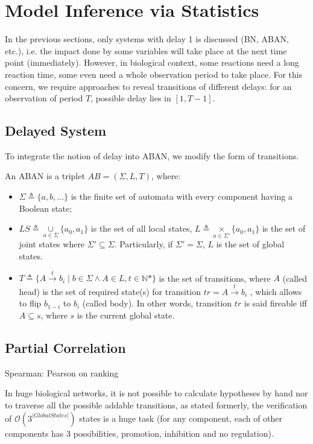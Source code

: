  

\section{Model Inference via Statistics}
In the previous sections, only systems with delay 1 is discussed (BN, ABAN, etc.), i.e. the impact done by some variables will take place at the next time point (immediately).
However, in biological context, some reactions need a long reaction time, some even need a whole observation period to take place.
For this concern, we require approaches to reveal transitions of different delays: for an observation of period $T$, possible delay lies in $[1,T-1]$.

\subsection{Delayed System}
To integrate the notion of delay into ABAN, we modify the form of transitions.

\begin{definition}
An ABAN is a triplet $AB = (\Sigma,L,T)$, where:
\begin{itemize}
\item $\Sigma\triangleq\{a,b,\ldots\}$ is the finite set of automata with every component having a Boolean state;
\item $LS\triangleq \underset{a\in \Sigma}{\cup} \{a_0,a_1\}$ is the set of all local states, $L\triangleq \underset{a\in \Sigma'}{\times} \{a_0,a_1\}$ is the set of joint states where $\Sigma'\subseteq\Sigma$. Particularly, if $\Sigma'=\Sigma$, $L$ is the set of global states. 
\item $T\triangleq \{A\xrightarrow{t} b_i\mid b\in \Sigma \land A\in L, t\in \mathbb{N}*\}$ is the set of transitions, where $A$ (called head) is the set of required state(s) for transition $tr=A\xrightarrow{t} b_i$ , which allows to flip $b_{1-i}$ to $b_i$ (called body). In other words, transition $tr$ is said fireable iff $A\subseteq s$, where $s$ is the current global state.
\end{itemize}
\end{definition}

\subsection{Partial Correlation}
Spearman: Pearson on ranking

In huge biological networks, it is not possible to calculate hypotheses by hand nor to traverse all the possible addable transitions, as stated formerly, the verification of $\mathcal{O}(3^{|Global States|})$ states is a huge task (for any component, each of other components has 3 possibilities, promotion, inhibition and no regulation).
 
